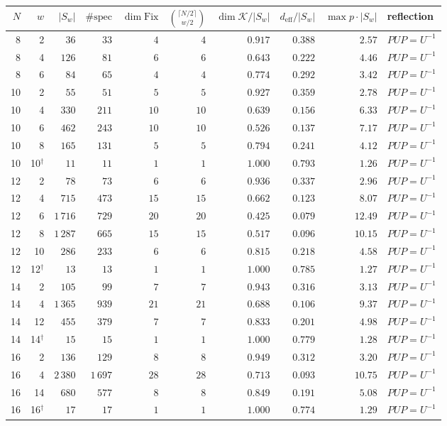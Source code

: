 \begin{tabular}{rrrrrrrrrl}
\hline
$N$ & $w$ & $|S_w|$ & $\#\mathrm{spec}$ & $\dim\mathrm{Fix}$ & $\binom{\lceil N/2\rceil}{w/2}$ & $\dim\mathcal{K}/|S_w|$ & $d_{\mathrm{eff}}/|S_w|$ & $\max p\cdot|S_w|$ & reflection \\
\hline
8 & 2 & $36$ & $33$ & $4$ & $4$ & $0.917$ & $0.388$ & $2.57$ & $PUP=U^{-1}$ \\
8 & 4 & $126$ & $81$ & $6$ & $6$ & $0.643$ & $0.222$ & $4.46$ & $PUP=U^{-1}$ \\
8 & 6 & $84$ & $65$ & $4$ & $4$ & $0.774$ & $0.292$ & $3.42$ & $PUP=U^{-1}$ \\
10 & 2 & $55$ & $51$ & $5$ & $5$ & $0.927$ & $0.359$ & $2.78$ & $PUP=U^{-1}$ \\
10 & 4 & $330$ & $211$ & $10$ & $10$ & $0.639$ & $0.156$ & $6.33$ & $PUP=U^{-1}$ \\
10 & 6 & $462$ & $243$ & $10$ & $10$ & $0.526$ & $0.137$ & $7.17$ & $PUP=U^{-1}$ \\
10 & 8 & $165$ & $131$ & $5$ & $5$ & $0.794$ & $0.241$ & $4.12$ & $PUP=U^{-1}$ \\
10 & 10$^\dagger$ & $11$ & $11$ & $1$ & $1$ & $1.000$ & $0.793$ & $1.26$ & $PUP=U^{-1}$ \\
12 & 2 & $78$ & $73$ & $6$ & $6$ & $0.936$ & $0.337$ & $2.96$ & $PUP=U^{-1}$ \\
12 & 4 & $715$ & $473$ & $15$ & $15$ & $0.662$ & $0.123$ & $8.07$ & $PUP=U^{-1}$ \\
12 & 6 & $1\,716$ & $729$ & $20$ & $20$ & $0.425$ & $0.079$ & $12.49$ & $PUP=U^{-1}$ \\
12 & 8 & $1\,287$ & $665$ & $15$ & $15$ & $0.517$ & $0.096$ & $10.15$ & $PUP=U^{-1}$ \\
12 & 10 & $286$ & $233$ & $6$ & $6$ & $0.815$ & $0.218$ & $4.58$ & $PUP=U^{-1}$ \\
12 & 12$^\dagger$ & $13$ & $13$ & $1$ & $1$ & $1.000$ & $0.785$ & $1.27$ & $PUP=U^{-1}$ \\
14 & 2 & $105$ & $99$ & $7$ & $7$ & $0.943$ & $0.316$ & $3.13$ & $PUP=U^{-1}$ \\
14 & 4 & $1\,365$ & $939$ & $21$ & $21$ & $0.688$ & $0.106$ & $9.37$ & $PUP=U^{-1}$ \\
14 & 12 & $455$ & $379$ & $7$ & $7$ & $0.833$ & $0.201$ & $4.98$ & $PUP=U^{-1}$ \\
14 & 14$^\dagger$ & $15$ & $15$ & $1$ & $1$ & $1.000$ & $0.779$ & $1.28$ & $PUP=U^{-1}$ \\
16 & 2 & $136$ & $129$ & $8$ & $8$ & $0.949$ & $0.312$ & $3.20$ & $PUP=U^{-1}$ \\
16 & 4 & $2\,380$ & $1\,697$ & $28$ & $28$ & $0.713$ & $0.093$ & $10.75$ & $PUP=U^{-1}$ \\
16 & 14 & $680$ & $577$ & $8$ & $8$ & $0.849$ & $0.191$ & $5.08$ & $PUP=U^{-1}$ \\
16 & 16$^\dagger$ & $17$ & $17$ & $1$ & $1$ & $1.000$ & $0.774$ & $1.29$ & $PUP=U^{-1}$ \\
\hline
\end{tabular}
